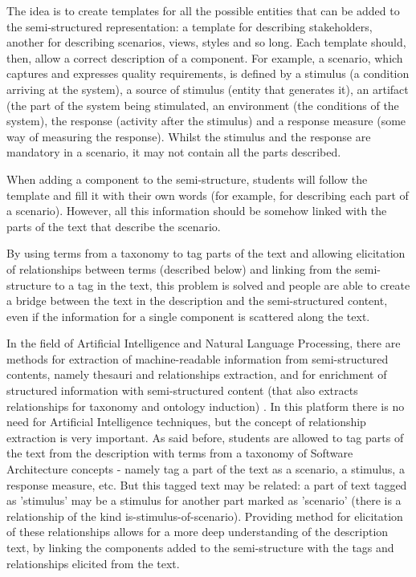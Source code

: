 \documentclass{llncs}
\begin{document}
The idea is to create templates for all the possible entities that can be added to the semi-structured representation: a template for describing stakeholders, another for describing scenarios, views, styles and so long. Each template should, then, allow a correct description of a component. For example, a scenario, which captures and expresses quality requirements, is defined by a stimulus (a condition arriving at the system), a source of stimulus (entity that generates it), an artifact (the part of the system being stimulated, an environment (the conditions of the system), the response (activity after the stimulus) and a response measure (some way of measuring the response). Whilst the stimulus and the response are mandatory in a scenario, it may not contain all the parts described.

When adding a component to the semi-structure, students will follow the template and fill it with their own words (for example, for describing each part of a scenario). However, all this information should be somehow linked with the parts of the text that describe the scenario.

By using terms from a taxonomy to tag parts of the text and allowing elicitation of relationships between terms (described below) and linking from the semi-structure to a tag in the text, this problem is solved and people are able to create a bridge between the text in the description and the semi-structured content, even if the information for a single component is scattered along the text.  

In the field of Artificial Intelligence and Natural Language Processing, there are methods for extraction of machine-readable information from semi-structured contents, namely thesauri and relationships extraction, and for enrichment of structured information with semi-structured content (that also extracts relationships for taxonomy and ontology induction) \cite{hovy2013collaboratively}. In this platform there is no need for Artificial Intelligence techniques, but the concept of relationship extraction is very important. As said before, students are allowed to tag parts of the text from the description with terms from a taxonomy of Software Architecture concepts - namely tag a part of the text as a scenario, a stimulus, a response measure, etc. But this tagged text may be related: a part of text tagged as 'stimulus' may be a stimulus for another part marked as 'scenario' (there is a relationship of the kind is-stimulus-of-scenario). Providing method for elicitation of these relationships allows for a more deep understanding of the description text, by linking the components added to the semi-structure with the tags and relationships elicited from the text.
\end{document}
